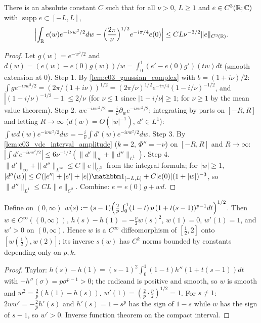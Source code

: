 \begin{lemma}
  \label{lem:c03_fresnel_expansion}
  There is an absolute constant $C$ such that for all $\nu>0$, $L\ge1$ and $e\in C^3(\mathbb{R};\mathbb{C})$ with $\operatorname{supp}e\subset[-L,L]$,
  \[
    \Bigl|\int_{\mathbb{R}} e(w)e^{-i\nu w^2/2}dw-\Bigl(\frac{2\pi}{\nu}\Bigr)^{1/2}e^{-i\pi/4}e(0)\Bigr|\le CL\nu^{-3/2}\|e\|_{C^3(\mathbb{R})}.
  \]
\end{lemma}
\begin{proof}
  Let $g(w)=e^{-w^2/2}$ and $d(w)=(e(w)-e(0)g(w))/w=\int_0^1(e'-e(0)g')(tw)dt$ (smooth extension at $0$).
  Step 1. By \cref{lem:c03_gaussian_complex} with $b=(1+i\nu)/2$: $\int ge^{-i\nu w^2/2}=(2\pi/(1+i\nu))^{1/2}=(2\pi/\nu)^{1/2}e^{-i\pi/4}(1-i/\nu)^{-1/2}$, and $|(1-i/\nu)^{-1/2}-1|\le2/\nu$ (for $\nu\le1$ since $|1-i/\nu|\ge1$; for $\nu\ge1$ by the mean value theorem).
  Step 2. $we^{-i\nu w^2/2}=\frac i\nu\partial_we^{-i\nu w^2/2}$; integrating by parts on $[-R,R]$ and letting $R\to\infty$ ($d(w)=O(|w|^{-1})$, $d'\in L^1$):
  $\int wd(w)e^{-i\nu w^2/2}dw=-\frac i\nu\int d'(w)e^{-i\nu w^2/2}dw$.
  Step 3. By \cref{lem:c03_vdc_interval_amplitude} ($k=2$, $\Phi''=-\nu$) on $[-R,R]$ and $R\to\infty$: $|\int d'e^{-i\nu w^2/2}|\le6\nu^{-1/2}(\|d'\|_\infty+\|d''\|_{L^1})$.
  Step 4. $\|d'\|_\infty+\|d''\|_{L^\infty}\le C\|e\|_{C^3}$ from the integral formula; for $|w|\ge1$, $|d''(w)|\le C(|e''|+|e'|+|e|)\mathbbm 1_{[-L,L]}+C|e(0)|(1+|w|)^{-3}$, so $\|d''\|_{L^1}\le CL\|e\|_{C^2}$.
  Combine: $e=e(0)g+wd$.
\end{proof}

\begin{lemma}[Morse coordinate for $h$ near $s=1$]
  \label{lem:c03_morse_h}
  Define on $(0,\infty)$
  $w(s):=(s-1)\Bigl(\frac2p\int_0^1(1-t)\,p\,(1+t(s-1))^{p-1}dt\Bigr)^{1/2}$.
  Then $w\in C^\infty((0,\infty))$, $h(s)-h(1)=-\frac p2w(s)^2$, $w(1)=0$, $w'(1)=1$, and $w'>0$ on $(0,\infty)$. Hence $w$ is a $C^\infty$ diffeomorphism of $[\frac12,2]$ onto $[w(\frac12),w(2)]$; its inverse $s(w)$ has $C^k$ norms bounded by constants depending only on $p,k$.
\end{lemma}
\begin{proof}
  Taylor: $h(s)-h(1)=(s-1)^2\int_0^1(1-t)h''(1+t(s-1))dt$ with $-h''(\sigma)=p\sigma^{p-1}>0$; the radicand is positive and smooth, so $w$ is smooth and $w^2=\frac2p(h(1)-h(s))$. $w'(1)=(\frac2p\cdot\frac p2)^{1/2}=1$. For $s\ne1$: $2ww'=-\frac2ph'(s)$ and $h'(s)=1-s^p$ has the sign of $1-s$ while $w$ has the sign of $s-1$, so $w'>0$. Inverse function theorem on the compact interval.
\end{proof}

